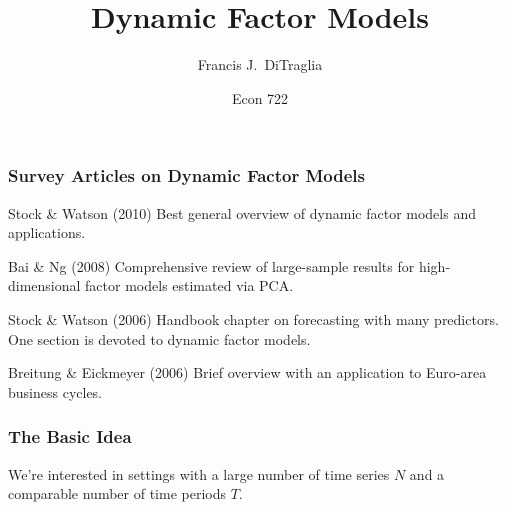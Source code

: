 \documentclass[handout]{beamer}
\title[Econ 722]{Dynamic Factor Models}
\author[F. DiTraglia]{Francis J.\ DiTraglia}
\institute{University of Pennsylvania}
\date{Econ 722}
\begin{document}
 



\begin{frame}[plain]
	\titlepage 
	

\end{frame} 


\begin{frame}
\frametitle{Survey Articles on Dynamic Factor Models}

\begin{block}
	{Stock \& Watson (2010)}
	Best general overview of dynamic factor models and applications.
\end{block}

\begin{block}
	{Bai \& Ng (2008)}
Comprehensive review of large-sample results for high-dimensional factor models estimated via PCA.
\end{block}

\begin{block}
	{Stock \& Watson (2006)}
	Handbook chapter on forecasting with many predictors. One section is devoted to dynamic factor models.
\end{block}

\begin{block}
	{Breitung \& Eickmeyer (2006)}
	Brief overview with an application to Euro-area business cycles. 
\end{block}

\end{frame}
\begin{frame}
	\frametitle{The Basic Idea}
	We're interested in settings with a large number of time series $N$ and a comparable number of time periods $T$. 
\end{frame}
\end{document}
